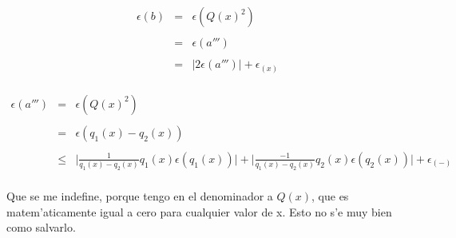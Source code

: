 \begin{eqnarray}
\epsilon(b) & = & \epsilon(Q(x)^2) \nonumber \\
\nonumber \\
& = & \epsilon(a''') \nonumber \\
\nonumber \\
& = & \Big| 2 \epsilon(a''') \Big| + \epsilon_{(x)} \nonumber \\
\nonumber
\end{eqnarray}

\begin{eqnarray}
\epsilon(a''') & = & \epsilon(Q(x)^2) \nonumber \\
\nonumber \\
& = & \epsilon(q_1(x) - q_2(x)) \nonumber \\
\nonumber \\
& \leq & \Big| \frac{1}{q_1(x) - q_2(x)} q_1(x) \epsilon(q_1(x)) \Big| +
\Big| \frac{-1}{q_1(x) - q_2(x)} q_2(x) \epsilon(q_2(x)) \Big| + \epsilon_{(-)} \nonumber \\
\nonumber
\end{eqnarray}

Que se me indefine, porque tengo en el denominador a $Q(x)$, que es matem'aticamente igual a cero
para cualquier valor de x.
Esto no s'e muy bien como salvarlo.

